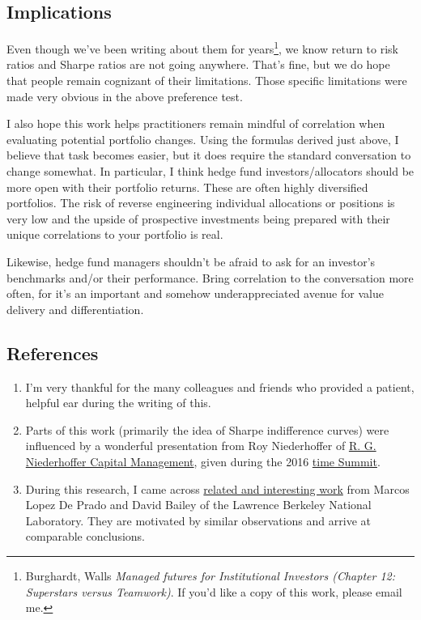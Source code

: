 \documentclass[]{article}
\providecommand{\tightlist}{%
  \setlength{\itemsep}{0pt}\setlength{\parskip}{0pt}}
\let\rmarkdownfootnote\footnote%
\def\footnote{\protect\rmarkdownfootnote}
\begin{document}
\hypertarget{implications}{%
\subsection{Implications}\label{implications}}

Even though we've been writing about them for years\footnote{Burghardt,
  Walls \emph{Managed futures for Institutional Investors (Chapter 12:
  Superstars versus Teamwork)}. If you'd like a copy of this work,
  please email me.}, we know return to risk ratios and Sharpe ratios are
not going anywhere. That's fine, but we do hope that people remain
cognizant of their limitations. Those specific limitations were made
very obvious in the above preference test.

I also hope this work helps practitioners remain mindful of correlation
when evaluating potential portfolio changes. Using the formulas derived
just above, I believe that task becomes easier, but it does require the
standard conversation to change somewhat. In particular, I think hedge
fund investors/allocators should be more open with their portfolio
returns. These are often highly diversified portfolios. The risk of
reverse engineering individual allocations or positions is very low and
the upside of prospective investments being prepared with their unique
correlations to your portfolio is real.

Likewise, hedge fund managers shouldn't be afraid to ask for an
investor's benchmarks and/or their performance. Bring correlation to the
conversation more often, for it's an important and somehow
underappreciated avenue for value delivery and differentiation.

\hypertarget{references}{%
\subsection{References}\label{references}}

\begin{enumerate}
\def\labelenumi{\arabic{enumi}.}
\tightlist
\item
  I'm very thankful for the many colleagues and friends who provided a
  patient, helpful ear during the writing of this.
\item
  Parts of this work (primarily the idea of Sharpe indifference curves)
  were influenced by a wonderful presentation from Roy Niederhoffer of
  \href{https://www.niederhoffer.com/}{R. G. Niederhoffer Capital
  Management}, given during the 2016 \href{https://timesummit.org/}{time
  Summit}.
\item
  During this research, I came across
  \href{https://pdfs.semanticscholar.org/c094/f7fd32f6e5c36f121a0d246d6127587a473a.pdf}{related
  and interesting work} from Marcos Lopez De Prado and David Bailey of
  the Lawrence Berkeley National Laboratory. They are motivated by
  similar observations and arrive at comparable conclusions.
\end{enumerate}
\end{document}
